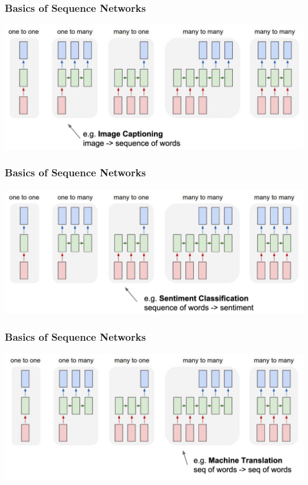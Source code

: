 \documentclass[aspectratio=1610]{beamer} %
\begin{document}
\begin{frame}

\frametitle{Basics of Sequence Networks}

\begin{center}
\includegraphics[width=\textwidth]{pics/rnn2}
\end{center}

\end{frame}


\begin{frame}

\frametitle{Basics of Sequence Networks}

\begin{center}
\includegraphics[width=\textwidth]{pics/rnn3}
\end{center}

\end{frame}



\begin{frame}

\frametitle{Basics of Sequence Networks}

\begin{center}
\includegraphics[width=\textwidth]{pics/rnn4}
\end{center}

\end{frame}
\end{document}
